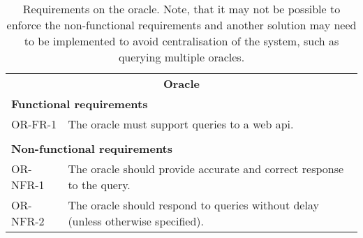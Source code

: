 \begin{table}[ht]
    \centering
    \begin{tabularx}{\textwidth}{|l X|}
    \hline
        \multicolumn{2}{|c|}{\textbf{Oracle}}\\
        \multicolumn{2}{|l|}{\textbf{Functional requirements}}\\
        OR-FR-1&The oracle must support queries to a web \acrshort{api}.\\
        &\\
        \multicolumn{2}{|l|}{\textbf{Non-functional requirements}}\\
        OR-NFR-1&The oracle should provide accurate and correct response to the query.\\
        OR-NFR-2&The oracle should respond to queries without delay (unless otherwise specified).\\
    \hline
    \end{tabularx}
    \caption{Requirements on the oracle. Note, that it may not be possible to enforce the non-functional requirements and another solution may need to be implemented to avoid centralisation of the system, such as querying multiple oracles.}
    \label{tab:reqs-oracle}
\end{table}

